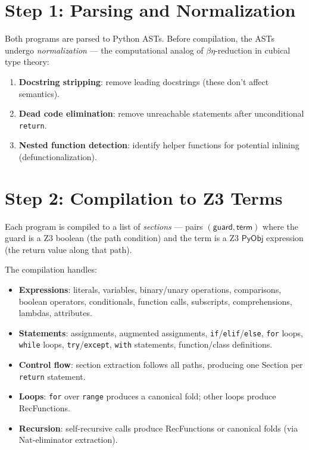 \documentclass[11pt,a4paper]{report}
\theoremstyle{definition}
\theoremstyle{plain}
\newcommand{\PyObj}{\mathsf{PyObj}}
\begin{document}
\section{Step 1: Parsing and Normalization}

Both programs are parsed to Python ASTs.  Before compilation, the
ASTs undergo \emph{normalization} --- the computational analog of
$\beta\eta$-reduction in cubical type theory:

\begin{enumerate}
  \item \textbf{Docstring stripping}: remove leading docstrings
    (these don't affect semantics).
  \item \textbf{Dead code elimination}: remove unreachable statements
    after unconditional \texttt{return}.
  \item \textbf{Nested function detection}: identify helper functions
    for potential inlining (defunctionalization).
\end{enumerate}

\section{Step 2: Compilation to Z3 Terms}

Each program is compiled to a list of \emph{sections} --- pairs
$(\mathsf{guard}, \mathsf{term})$ where the guard is a Z3 boolean
(the path condition) and the term is a Z3 $\PyObj$ expression (the
return value along that path).

The compilation handles:

\begin{itemize}
  \item \textbf{Expressions}: literals, variables, binary/unary
    operations, comparisons, boolean operators, conditionals,
    function calls, subscripts, comprehensions, lambdas, attributes.
  \item \textbf{Statements}: assignments, augmented assignments,
    \texttt{if}/\texttt{elif}/\texttt{else}, \texttt{for} loops,
    \texttt{while} loops, \texttt{try}/\texttt{except},
    \texttt{with} statements, function/class definitions.
  \item \textbf{Control flow}: section extraction follows all paths,
    producing one Section per \texttt{return} statement.
  \item \textbf{Loops}: \texttt{for} over \texttt{range} produces
    a canonical fold; other loops produce RecFunctions.
  \item \textbf{Recursion}: self-recursive calls produce RecFunctions
    or canonical folds (via Nat-eliminator extraction).
\end{itemize}
\end{document}

